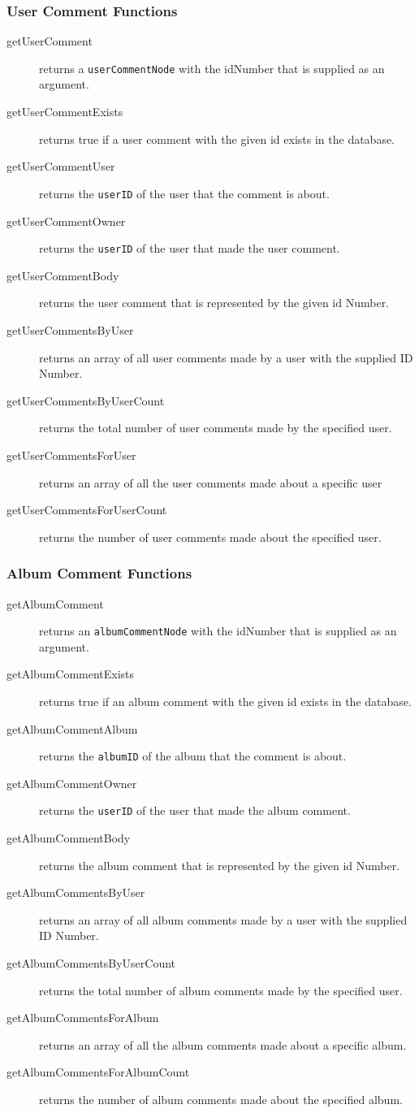 \documentclass{article}
\begin{document}
\subsubsection{User Comment Functions}
\begin{description}
\item[getUserComment] returns a \verb|userCommentNode| with the idNumber that is supplied as an argument. 
\item[getUserCommentExists] returns true if a user comment with the given id exists in the database.
\item[getUserCommentUser] returns the \verb|userID| of the user that the comment is about.
\item[getUserCommentOwner] returns the \verb|userID| of the user that made the user comment.
\item[getUserCommentBody] returns the  user comment that is represented by the given id Number.
\item[getUserCommentsByUser] returns an array of all user comments made by a user with the supplied ID Number.
\item[getUserCommentsByUserCount] returns the total number of user comments made by the specified user.
\item[getUserCommentsForUser] returns an array of all the user comments made about a specific user
\item[getUserCommentsForUserCount] returns the number of user comments made about the specified user.
\end{description}

\subsubsection{Album Comment Functions}
\begin{description}
\item[getAlbumComment] returns an \verb|albumCommentNode| with the idNumber that is supplied as an argument. 
\item[getAlbumCommentExists] returns true if an album comment with the given id exists in the database.
\item[getAlbumCommentAlbum] returns the \verb|albumID| of the album that the comment is about.
\item[getAlbumCommentOwner] returns the \verb|userID| of the user that made the album comment.
\item[getAlbumCommentBody] returns the  album comment that is represented by the given id Number.
\item[getAlbumCommentsByUser] returns an array of all album comments made by a user with the supplied ID Number.
\item[getAlbumCommentsByUserCount] returns the total number of album comments made by the specified user.
\item[getAlbumCommentsForAlbum] returns an array of all the album comments made about a specific album.
\item[getAlbumCommentsForAlbumCount] returns the number of album comments made about the specified album.
\end{description}
\end{document}

